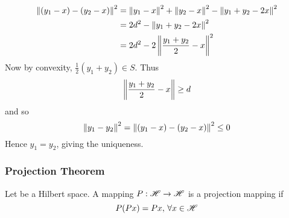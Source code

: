 \begin{proposition}
	\begin{equation}
		\begin{split}
			\left\|{(y_1-x)-(y_2-x)}\right\|^2&=\left\|{y_1-x}\right\|^2+\left\|{y_2-x}\right\|^2-\left\|{y_1+y_2-2x}\right\|^2\\
			&=2d^2-\left\|{y_1+y_2-2x}\right\|^2\\
			&=2d^2-2\left\|{\frac{y_1+y_2}{2}-x}\right\|^2\\
		\end{split}
	\end{equation}
	Now by convexity, $\frac{1}{2}(y_1+y_2)\in S$. Thus
	$$\left\|{\frac{y_1+y_2}{2}-x}\right\|\geq d$$
	and so
	$$
		\left\|{y_1-y_2}\right\|^2=\left\|{(y_1-x)-(y_2-x)}\right\|^2\leq0
	$$
	Hence $y_1=y_2$, giving the uniqueness.
\end{proposition}



\subsubsection{Projection Theorem}
\begin{definition}\rm\nextline
	Let \hbs be a Hilbert space. A mapping $P:\mathscr{H}\xrightarrow{}\mathscr{H}$ is a projection mapping if $$
		P(Px)=Px,\,\forall x\in\mathscr{H}
	$$


\end{definition}


